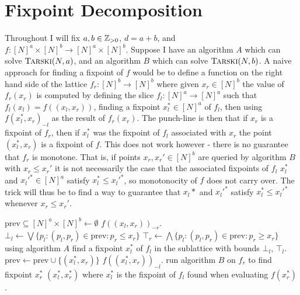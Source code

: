 \section{Fixpoint Decomposition}
Throughout I will fix $a, b \in \mathbb{Z}_{> 0}$,
$d = a + b$, and $f : [N]^a \times [N]^b \to [N]^a \times [N]^b$.
Suppose I have an algorithm $A$ which can solve $\textsc{Tarski}(N, a)$,
and an algorithm $B$ which can solve $\textsc{Tarski}(N, b)$. A naive approach 
for finding a fixpoint of $f$ would be to define a
function on the right hand side of the lattice
$f_r : [N]^b \to [N]^b$ where given $x_r \in [N]^b$ the value of 
$f_r(x_r)$
is computed by defining the slice $f_l : [N]^a \to [N]^a$
such that $f_l(x_l) = f((x_l, x_r))$, finding a fixpoint $x_l^* \in [N]^a$
of $f_l$, then using $f(x_l^*, x_r)_{-l}$ as the result of $f_r(x_r)$.
The punch-line is then that if $x_r$ is a fixpoint of $f_r$, then if
$x_l^*$ was the fixpoint of $f_l$ associated with $x_r$ the point
$(x_l^*, x_r)$ is a fixpoint of $f$. This does not work however -
there is no guarantee that $f_r$ is monotone. That is,
if points $x_r, x_r' \in [N]^b$ are queried by algorithm $B$
with $x_r \leq x_r'$ it is not necessarily the case that the associated
fixpoints of $f_l$ $x_l^*$ and $x_l'^* \in [N]^a$ satisfy $x_l^* \leq x_l'^*$, so
monotonocity of $f$ does not carry over. The trick will thus be
to find a way to guarantee that $x_l*$ and $x_l'^*$ satisfy 
$x_l^* \leq x_l'^*$ whenever $x_r \leq x_r'$.

\begin{algorithm}[h]
  \caption{\citep{fasterTarski}}\label{fixDecompAlg}
  \begin{algorithmic}[1]

    \State $\text{prev} \subseteq [N]^a \times [N]^b \gets \emptyset$
        \Return $f((x_l, x_r))_{-r}$.
      \EndProcedure
      \State $\bot_l \gets \bigvee\{p_l : (p_l, p_r) \in \text{prev} : p_r \leq x_r \}$
      \State $\top_r \gets \bigwedge\{p_l : (p_l, p_r) \in \text{prev} : p_r \geq x_r \}$
      \State using algorithm $A$ find a fixpoint $x_l^*$ of $f_l$ in the sublattice with bounds
      $\bot_l$, $\top_l$.
      \State $\text{prev} \gets \text{prev} \cup \{(x_l^*, x_r)\}$
      \State \Return $f((x_l^*, x_r))_{-l}$.
    \EndProcedure
    \State run algorithm $B$ on $f_r$ to find fixpoint $x_r^*$
    \State \Return $(x_l^*, x_r^*)$ where $x_l^*$ is the fixpoint of $f_l$ 
    found when evaluating $f(x_r^*)$.
  \EndProcedure
  \end{algorithmic}
\end{algorithm}

